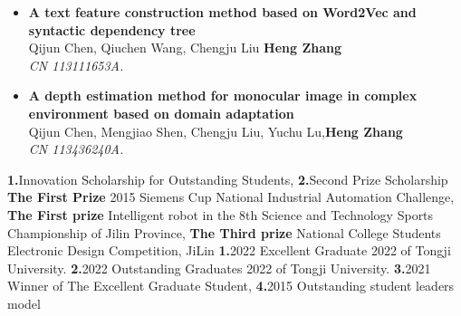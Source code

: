 \documentclass{resume}
\begin{document}
\begin{itemize}
\item \textbf{A text feature construction method based on Word2Vec and syntactic dependency tree}\quad {}\\
  \footnotesize{ Qijun Chen, Qiuchen Wang, Chengju Liu \textbf{Heng Zhang}}\\
  \footnotesize{\textit{ CN 113111653A.}}\\
  
\item \textbf{A depth estimation method for monocular image in complex environment based on domain adaptation}\quad {}\\
  \footnotesize{ Qijun Chen, Mengjiao Shen, Chengju Liu, Yuchu Lu,\textbf{Heng Zhang}}\\
  \footnotesize{\textit{ CN 113436240A.}}\\
       
\end{itemize}

\begin{competences}[6em]
  {
    \textbf{1.}Innovation Scholarship for Outstanding Students,
    \textbf{2.}Second Prize Scholarship
  }
  {%
    \textbf{The First Prize} 2015 Siemens Cup National Industrial Automation Challenge,
    \textbf{The First prize} Intelligent robot in the 8th Science and Technology Sports Championship of Jilin Province,
    \textbf{The Third prize} National College Students Electronic Design Competition, JiLin
  }
  {%
  \textbf{1.}2022 Excellent Graduate 2022 of Tongji University.
  \textbf{2.}2022 Outstanding Graduates 2022 of Tongji University.
  \textbf{3.}2021 Winner of The Excellent Graduate Student,
  \textbf{4.}2015 Outstanding student leaders model
  }

\end{competences}
\end{document}
